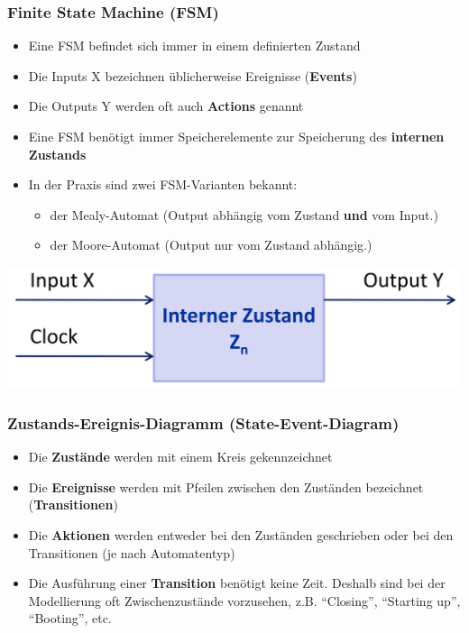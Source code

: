 \subsubsection{Finite State Machine (FSM)}
\begin{minipage}{0.75\linewidth}
  \begin{itemize}
    \item Eine FSM befindet sich immer in einem definierten Zustand
    \item Die Inputs X bezeichnen üblicherweise Ereignisse (\textbf{Events})
    \item Die Outputs Y werden oft auch \textbf{Actions} genannt
    \item Eine FSM benötigt immer Speicherelemente zur Speicherung des \textbf{internen Zustands}
    \item In der Praxis sind zwei FSM-Varianten bekannt: \begin{itemize}
            \item der Mealy-Automat (Output abhängig vom Zustand \textbf{und} vom Input.)
            \item der Moore-Automat (Output nur vom Zustand abhängig.)
          \end{itemize}
  \end{itemize}
\end{minipage}
\begin{minipage}{0.25\linewidth}
  \includegraphics[width=\linewidth]{./images/FSM/fsm}
  \vfill\null
\end{minipage}

\subsubsection{Zustands-Ereignis-Diagramm (State-Event-Diagram)}
\begin{itemize}
  \item Die \textbf{Zustände} werden mit einem Kreis gekennzeichnet
  \item Die \textbf{Ereignisse} werden mit Pfeilen zwischen den Zuständen bezeichnet
        (\textbf{Transitionen})
  \item Die \textbf{Aktionen} werden entweder bei den Zuständen geschrieben oder bei den
        Transitionen (je nach Automatentyp)
  \item Die Ausführung einer \textbf{Transition} benötigt keine Zeit. Deshalb sind bei
        der Modellierung oft Zwischenzustände vorzusehen, z.B. "`Closing"', "`Starting
        up"', "`Booting"', etc.
\end{itemize}

